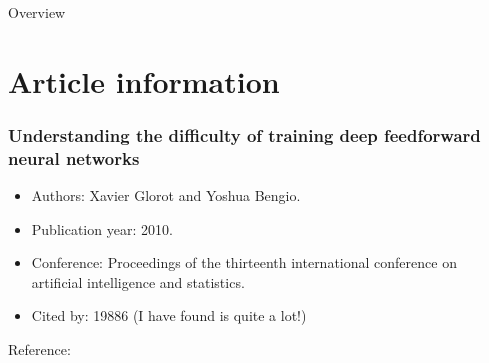


\begin{frame}{Overview}
  \tableofcontents
\end{frame}
\section{Article information}

\begin{frame}
    \frametitle{Understanding the difficulty of training deep feedforward neural networks}
      \begin{itemize}
        \item Authors: Xavier Glorot and Yoshua Bengio.
        \item Publication year: 2010.
        \item Conference: Proceedings of the thirteenth international conference on artificial intelligence and statistics.
        \item Cited by: 19886 (I have found is quite a lot!) 
      \end{itemize}
      Reference: \cite{Understanding_the_difficulty_of_training_deep_feedforward_neural_networks}
\end{frame}

